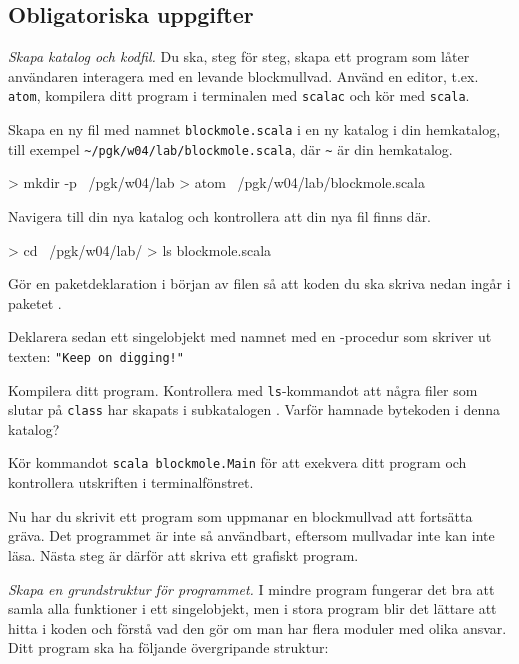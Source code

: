 \subsection{Obligatoriska uppgifter}


\Task \emph{Skapa katalog och kodfil.}
Du ska, steg för steg, skapa ett program som låter användaren interagera med en levande blockmullvad. Använd en editor, t.ex. \texttt{atom}, kompilera ditt program i terminalen med \texttt{scalac} och kör med \texttt{scala}.

\Subtask
Skapa en ny fil med namnet \texttt{blockmole.scala} i en ny katalog i din hemkatalog, till exempel \texttt{\textasciitilde/pgk/w04/lab/blockmole.scala}, där \texttt{\textasciitilde} är din hemkatalog.
\begin{REPLnonum}
> mkdir -p ~/pgk/w04/lab
> atom ~/pgk/w04/lab/blockmole.scala
\end{REPLnonum}


\Subtask
Navigera till din nya katalog och kontrollera att din nya fil finns där.
\begin{REPLnonum}
> cd ~/pgk/w04/lab/
> ls
blockmole.scala
\end{REPLnonum}

\Subtask
Gör en paketdeklaration i början av filen  så att koden du ska skriva nedan ingår i paketet .

\Subtask
Deklarera sedan ett singelobjekt med namnet  med en -procedur som skriver ut texten: \texttt{"Keep on digging!"}

\Subtask
Kompilera ditt program. Kontrollera med \texttt{ls}-kommandot att några filer som slutar på \texttt{class} har skapats i subkatalogen . \Pen Varför hamnade bytekoden i denna katalog?

\Subtask
Kör kommandot \texttt{scala blockmole.Main} för att exekvera ditt program och kontrollera utskriften i terminalfönstret.

\vspace{1em}\noindent Nu har du skrivit ett program som uppmanar en blockmullvad att fortsätta gräva. Det programmet är inte så användbart, eftersom mullvadar inte kan inte läsa. Nästa steg är därför att skriva ett grafiskt program.%



\Task \emph{Skapa en grundstruktur för programmet.}
I mindre program fungerar det bra att samla alla funktioner i ett singelobjekt, men i stora program blir det lättare att hitta i koden och förstå vad den gör om man har flera moduler med olika ansvar. Ditt program ska ha följande övergripande struktur:

